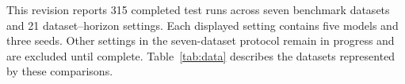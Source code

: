 This revision reports 315 completed test runs across seven benchmark datasets and 21 dataset--horizon settings. Each displayed setting contains five models and three seeds. Other settings in the seven-dataset protocol remain in progress and are excluded until complete. Table~\ref{tab:data} describes the datasets represented by these comparisons.
